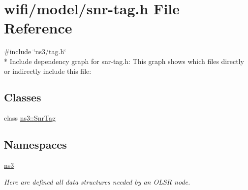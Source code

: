 \hypertarget{snr-tag_8h}{}\section{wifi/model/snr-\/tag.h File Reference}
\label{snr-tag_8h}
{\ttfamily \#include \char`\"{}ns3/tag.\+h\char`\"{}}\\*
Include dependency graph for snr-\/tag.h\+:
This graph shows which files directly or indirectly include this file\+:
\subsection*{Classes}
\begin{DoxyCompactItemize}
\item 
class \hyperlink{classns3_1_1SnrTag}{ns3\+::\+Snr\+Tag}
\end{DoxyCompactItemize}
\subsection*{Namespaces}
\begin{DoxyCompactItemize}
\item 
 \hyperlink{namespacens3}{ns3}
\begin{DoxyCompactList}\small\item\em Here are defined all data structures needed by an O\+L\+SR node. \end{DoxyCompactList}\end{DoxyCompactItemize}

